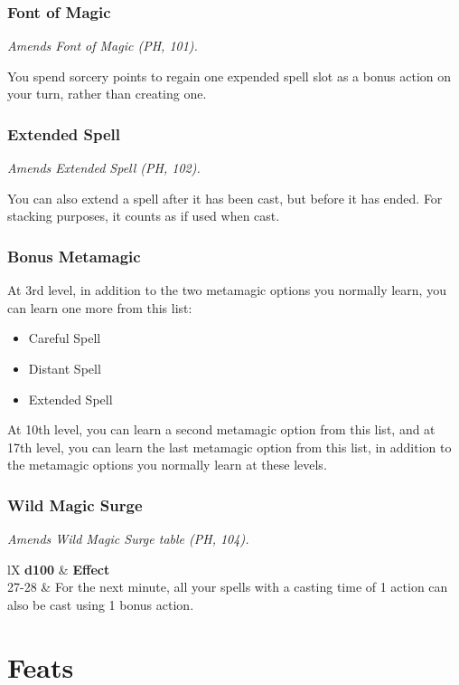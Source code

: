 \documentclass[letterpaper,twocolumn,openany,nodeprecatedcode]{dndbook}
\begin{document}
\subsubsection{Font of Magic}
\textit{Amends Font of Magic (PH, 101).}

You spend sorcery points to regain one expended spell slot as a bonus action on your turn, rather than creating one.

\subsubsection{Extended Spell}
\textit{Amends Extended Spell (PH, 102).}

You can also extend a spell after it has been cast, but before it has ended. For stacking purposes, it counts as if used when cast.

\subsubsection{Bonus Metamagic}
At 3rd level, in addition to the two metamagic options you normally learn, you can learn one more from this list:

\begin{itemize}
\item Careful Spell
\item Distant Spell 
\item Extended Spell
\end{itemize}

At 10th level, you can learn a second metamagic option from this list, and at 17th level, you can learn the last metamagic option from this list, in addition to the metamagic options you normally learn at these levels.

\subsubsection{Wild Magic Surge}
\textit{Amends Wild Magic Surge table (PH, 104).}

\begin{DndTable}[]{lX}
    \textbf{d100} & \textbf{Effect} \\
    27-28 & For the next minute, all your spells with a casting time of 1 action can also be cast using 1 bonus action.
\end{DndTable}



\label{balance-feats}
\section{Feats}
\end{document}
